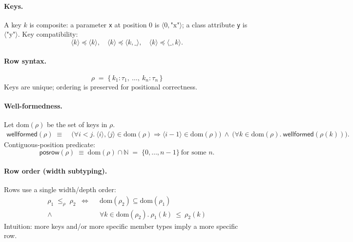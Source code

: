 \paragraph{Keys.}
A key $k$ is composite: a parameter \texttt{x} at position $0$ is $\langle 0,\text{"x"} \rangle$; a class attribute \texttt{y} is $\langle \text{"y"} \rangle$.
Key compatibility:
\[
\langle k \rangle \preccurlyeq \langle k \rangle,\quad
\langle k \rangle \preccurlyeq \langle k, \_ \rangle,\quad
\langle k \rangle \preccurlyeq \langle \_, k \rangle.
\]

\paragraph{Row syntax.}
\[
\rho \;=\; \{\, k_1 : \tau_1,\ \dots,\ k_n : \tau_n \,\}
\]
Keys are unique; ordering is preserved for positional correctness.

\paragraph{Well-formedness.}
Let $\mathrm{dom}(\rho)$ be the set of keys in $\rho$.
\begin{align}
\mathsf{wellformed}(\rho) \;\equiv\;&
\big(\forall i<j.\ \langle i\rangle,\langle j\rangle \in \mathrm{dom}(\rho) \Rightarrow \langle i{-}1\rangle \in \mathrm{dom}(\rho)\big)\ \wedge\ 
\big(\forall k\in\mathrm{dom}(\rho).\ \mathsf{wellformed}(\rho(k))\big).
\end{align}
Contiguous-position predicate:
\[
\mathsf{posrow}(\rho) \;\equiv\; \mathrm{dom}(\rho)\cap\mathbb{N} \;=\; \{0,\dots,n{-}1\}\ \text{for some } n.
\]

\paragraph{Row order (width subtyping).}
Rows use a single width/depth order:
\begin{align*}
\rho_1 \;\le_\rho\; \rho_2 \;\;\iff\;\;
& \mathrm{dom}(\rho_2)\subseteq \mathrm{dom}(\rho_1) \\
\wedge \; & \forall k\in\mathrm{dom}(\rho_2).\ \rho_1(k)\ \le\ \rho_2(k)
\end{align*}
Intuition: more keys and/or more specific member types imply a more specific row.

